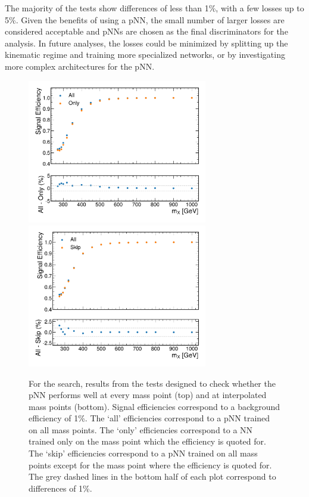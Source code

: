 The majority of the tests show differences of less than 1\%, with a few losses up to 5\%. Given the benefits of using a pNN, the small number of larger losses are considered acceptable and pNNs are chosen as the final discriminators for the analysis. In future analyses, the losses could be minimized by splitting up the kinematic regime and training more specialized networks, or by investigating more complex architectures for the pNN.

\begin{figure}
    \centering
    \includegraphics[width=0.7\textwidth]{Figures/Dihiggs/categorisation/param_tests/Graviton/all_only.pdf} \\
    \includegraphics[width=0.7\textwidth]{Figures/Dihiggs/categorisation/param_tests/Graviton/all_skip.pdf}
    \caption[pNN Validation Tests in the \XTwoHH Search]{For the \XTwoHH search, results from the tests designed to check whether the pNN performs well at every mass point (top) and at interpolated mass points (bottom). Signal efficiencies correspond to a background efficiency of 1\%. The `all' efficiencies correspond to a pNN trained on all mass points. The `only' efficiencies correspond to a NN trained only on the mass point which the efficiency is quoted for. The `skip' efficiencies correspond to a pNN trained on all mass points except for the mass point where the efficiency is quoted for. The grey dashed lines in the bottom half of each plot correspond to differences of 1\%.}\label{fig:param_tests_graviton}
\end{figure}

